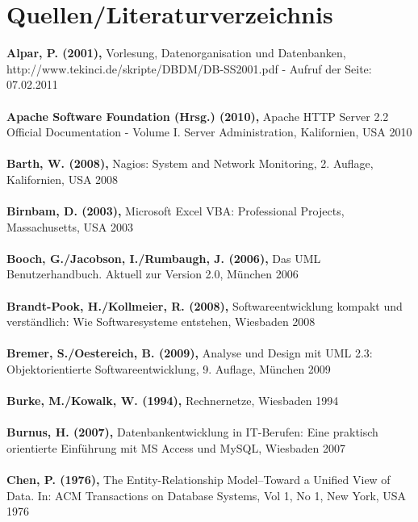 \chapter*{Quellen/Literaturverzeichnis}



\textbf{Alpar, P. (2001),} Vorlesung, Datenorganisation und Datenbanken,\\http://www.tekinci.de/skripte/DBDM/DB-SS2001.pdf - Aufruf der Seite: 07.02.2011\\\\
\textbf{Apache Software Foundation (Hrsg.) (2010),} Apache HTTP Server 2.2 Official Documentation - Volume I. Server Administration, Kalifornien, USA 2010\\\\
\textbf{Barth, W. (2008),} Nagios: System and Network Monitoring, 2. Auflage, Kalifornien, USA 2008\\\\
\textbf{Birnbam, D. (2003),} Microsoft Excel VBA: Professional Projects, Massachusetts, USA 2003\\\\
\textbf{Booch, G./Jacobson, I./Rumbaugh, J. (2006),} Das UML Benutzerhandbuch. Aktuell zur Version 2.0, München 2006\\\\
\textbf{Brandt-Pook, H./Kollmeier, R. (2008),} Softwareentwicklung kompakt und verständlich: Wie Softwaresysteme entstehen, Wiesbaden 2008\\\\
\textbf{Bremer, S./Oestereich, B. (2009),} Analyse und Design mit UML 2.3: Objektorientierte Softwareentwicklung, 9. Auflage, München 2009\\\\
\textbf{Burke, M./Kowalk, W. (1994),} Rechnernetze, Wiesbaden 1994\\\\
\textbf{Burnus, H. (2007),} Datenbankentwicklung in IT-Berufen: Eine praktisch orientierte Einführung mit MS Access und MySQL, Wiesbaden 2007\\\\
\textbf{Chen, P. (1976),} The Entity-Relationship Model--Toward a Unified View of Data. In: ACM Transactions on Database Systems, Vol 1, No 1, New York, USA 1976\\\\
